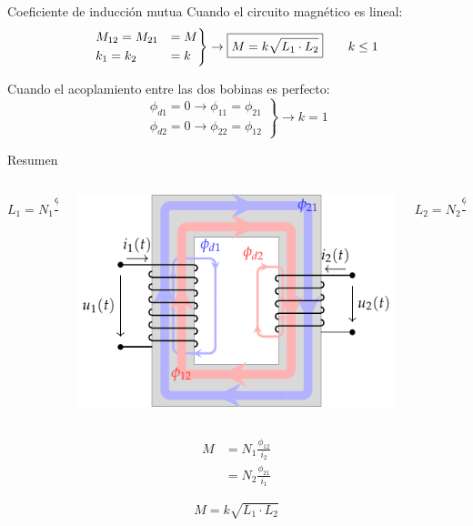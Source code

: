 \documentclass[aspectratio=169, usenames,svgnames,dvipsnames]{beamer}
\begin{document}
\begin{frame}[label={sec:org7ee28ea}]{Coeficiente de inducción mutua}
Cuando el circuito magnético es \alert{lineal}:
\[
  \begin{rcases}
  M_{12} = M_{21} &= M\\
  k_1 = k_2 &= k    
  \end{rcases}
  \rightarrow \boxed{M = k \sqrt{L_1 \cdot L_2}} \qquad  k \leq 1
\]

Cuando el acoplamiento entre las dos bobinas es perfecto:
\[\left.
\begin{array}{cc}
  \phi_{d1} = 0 \rightarrow   \phi_{11} = \phi_{21}\\
  \phi_{d2} = 0 \rightarrow \phi_{22} = \phi_{12} 
  \end{array} \right\} \rightarrow k = 1
\]
\end{frame}

\begin{frame}[label={sec:orga182bd5}]{Resumen}
\begin{columns}
\begin{column}{0.3\columnwidth}
\[
  L_1 = N_1 \frac{\phi_{11}}{i_1}
\]
\end{column}

\begin{column}{0.3\columnwidth}
\begin{center}
\includegraphics[height=0.4\textheight]{../figs/acoplamientoTikz.pdf}
\end{center}
\end{column}

\begin{column}{0.3\columnwidth}
\[
  L_2 = N_2 \frac{\phi_{22}}{i_2}
\]
\end{column}
\end{columns}

\begin{align*}
  M &= N_1 \frac{\phi_{12}}{i_2}\\
    &= N_2 \frac{\phi_{21}}{i_1}
\end{align*}

\[
  M = k \sqrt{L_1 \cdot L_2}
\]
\end{frame}
\end{document}
